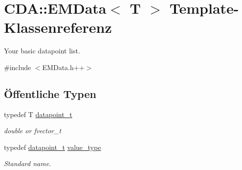 \hypertarget{classCDA_1_1EMData}{
\section{CDA::EMData$<$ T $>$ Template-\/Klassenreferenz}
\label{classCDA_1_1EMData}
}


Your basic datapoint list.  




{\ttfamily \#include $<$EMData.h++$>$}

\subsection*{Öffentliche Typen}
\begin{DoxyCompactItemize}
\item 
\hypertarget{classCDA_1_1EMData_a320dfbd3ad13091a99602a140688a05d}{
typedef T \hyperlink{classCDA_1_1EMData_a320dfbd3ad13091a99602a140688a05d}{datapoint\_\-t}}
\label{classCDA_1_1EMData_a320dfbd3ad13091a99602a140688a05d}

\begin{DoxyCompactList}\small\item\em double or fvector\_\-t \item\end{DoxyCompactList}\item 
\hypertarget{classCDA_1_1EMData_a010a85bcffac375b7b0d9dfbc0ed2626}{
typedef \hyperlink{classCDA_1_1EMData_a320dfbd3ad13091a99602a140688a05d}{datapoint\_\-t} \hyperlink{classCDA_1_1EMData_a010a85bcffac375b7b0d9dfbc0ed2626}{value\_\-type}}
\label{classCDA_1_1EMData_a010a85bcffac375b7b0d9dfbc0ed2626}

\begin{DoxyCompactList}\small\item\em Standard name. \item\end{DoxyCompactList}\end{DoxyCompactItemize}
